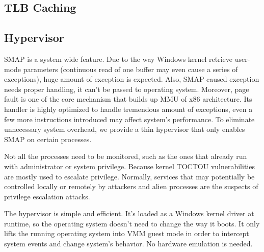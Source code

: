 


\subsection{TLB Caching}


\subsection{Hypervisor}

SMAP is a system wide feature. Due to the way Windows kernel retrieve user-mode parameters (continuous read of one buffer may even cause a series of exceptions), huge amount of exception is expected. Also, SMAP caused exception needs proper handling, it can't be passed to operating system. Moreover, page fault is one of the core mechanism that builds up MMU of x86 architecture. Its handler is highly optimized to handle tremendous amount of exceptions, even a few more instructions introduced may affect system's performance.  To eliminate unnecessary system overhead, we provide a thin hypervisor that only enables SMAP on certain processes.

Not all the processes need to be monitored, such as the ones that already run with administrator or system privilege. Because kernel TOCTOU vulnerabilities are mostly used to escalate privilege. Normally, services that may potentially be controlled locally or remotely by attackers and alien processes are the suspects of privilege escalation attacks.

The hypervisor is simple and efficient. It's loaded as a Windows kernel driver at runtime, so the operating system doesn't need to change the way it boots. It only lifts the running operating system into VMM guest mode in order to intercept system events and change system's behavior. No hardware emulation is needed.  

